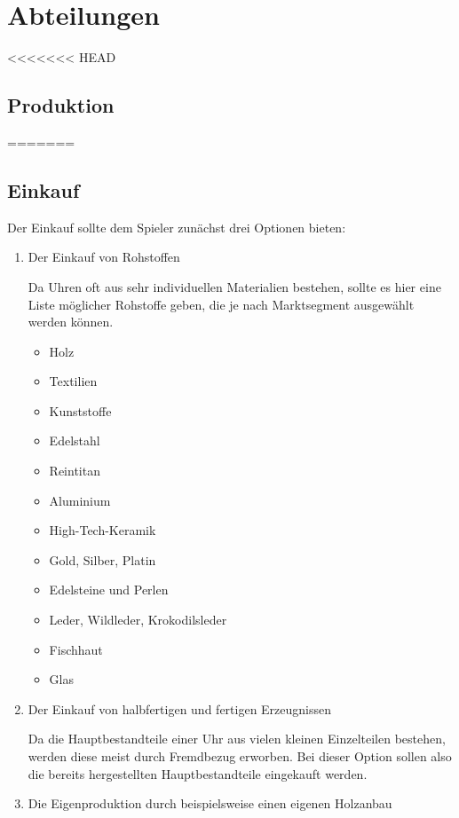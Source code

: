 \clearpage
\chapter{Abteilungen}
<<<<<<< HEAD
\section{Produktion}
=======
\section{Einkauf}\label{sec:einkauf}
Der Einkauf sollte dem Spieler zunächst drei Optionen bieten:
\begin{enumerate}
\item Der Einkauf von Rohstoffen \par
Da Uhren oft aus sehr individuellen Materialien bestehen, sollte es hier eine Liste möglicher Rohstoffe geben, die je nach Marktsegment ausgewählt werden können.
\begin{itemize}
\item	Holz	\\
\item	Textilien	\\
\item	Kunststoffe	\\
\item	Edelstahl \\
\item	Reintitan \\
\item	Aluminium \\
\item	High-Tech-Keramik \\
\item	Gold, Silber, Platin
\item Edelsteine und Perlen \\
\item Leder, Wildleder, Krokodilsleder \\
\item	Fischhaut
\item	Glas \\
\end{itemize}
\item Der Einkauf von halbfertigen und fertigen Erzeugnissen \par
Da die Hauptbestandteile einer Uhr aus vielen kleinen Einzelteilen bestehen, werden diese meist durch Fremdbezug erworben. Bei dieser Option sollen also die bereits hergestellten Hauptbestandteile eingekauft werden.
\item Die Eigenproduktion durch beispielsweise einen eigenen Holzanbau
\end{enumerate}

